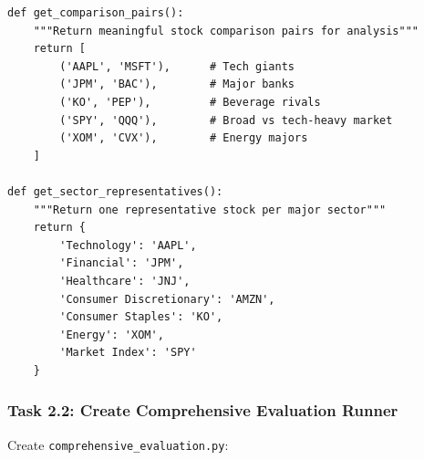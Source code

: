 \documentclass[11pt]{article}
\begin{document}
\begin{lstlisting}[style=pythonstyle, caption=Stock Categorization System]
def get_comparison_pairs():
    """Return meaningful stock comparison pairs for analysis"""
    return [
        ('AAPL', 'MSFT'),      # Tech giants
        ('JPM', 'BAC'),        # Major banks
        ('KO', 'PEP'),         # Beverage rivals
        ('SPY', 'QQQ'),        # Broad vs tech-heavy market
        ('XOM', 'CVX'),        # Energy majors
    ]

def get_sector_representatives():
    """Return one representative stock per major sector"""
    return {
        'Technology': 'AAPL',
        'Financial': 'JPM', 
        'Healthcare': 'JNJ',
        'Consumer Discretionary': 'AMZN',
        'Consumer Staples': 'KO',
        'Energy': 'XOM',
        'Market Index': 'SPY'
    }
\end{lstlisting}

\subsubsection{Task 2.2: Create Comprehensive Evaluation Runner}

Create \texttt{comprehensive\_evaluation.py}:
\end{document}

